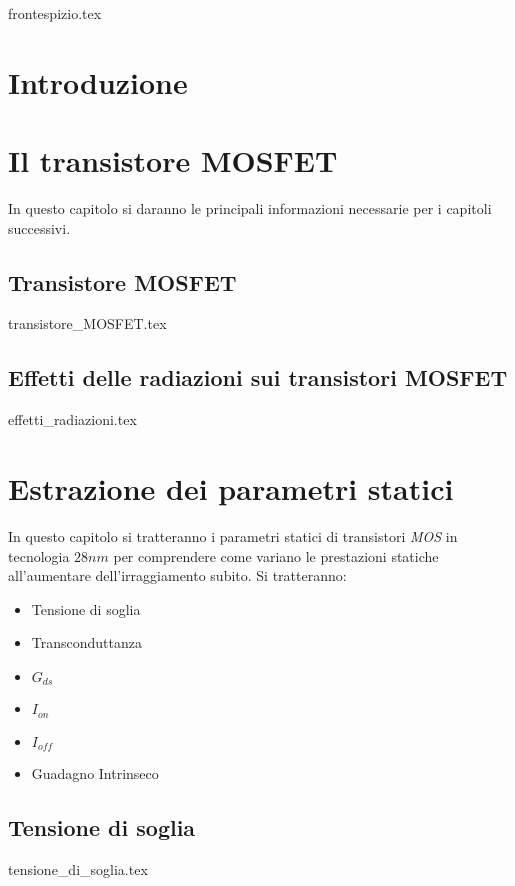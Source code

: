 \documentclass[
	a4paper,
	cleardoublepage=empty,
	headings=twolinechapter,
	numbers=autoenddot,
]{scrbook}
\begin{document}
\frontmatter

{frontespizio.tex}

\tableofcontents

\chapter*{Introduzione}


\mainmatter

\chapter{Il transistore MOSFET}
In questo capitolo si daranno le principali informazioni necessarie per i capitoli successivi.
\section{Transistore MOSFET}
{transistore_MOSFET.tex}

\section{Effetti delle radiazioni sui transistori MOSFET}
{effetti_radiazioni.tex}


\chapter{Estrazione dei parametri statici}
In questo capitolo si tratteranno i parametri statici di transistori \emph{MOS} in tecnologia $28 nm$ per comprendere come variano le prestazioni statiche all'aumentare dell'irraggiamento subito. Si tratteranno:
\begin{itemize}
  \item Tensione di soglia
  \item Transconduttanza
  \item $G_{ds}$
  \item $I_{on}$
  \item $I_{off}$
  \item Guadagno Intrinseco
\end{itemize}
\section{Tensione di soglia}
{tensione_di_soglia.tex}
\end{document}
